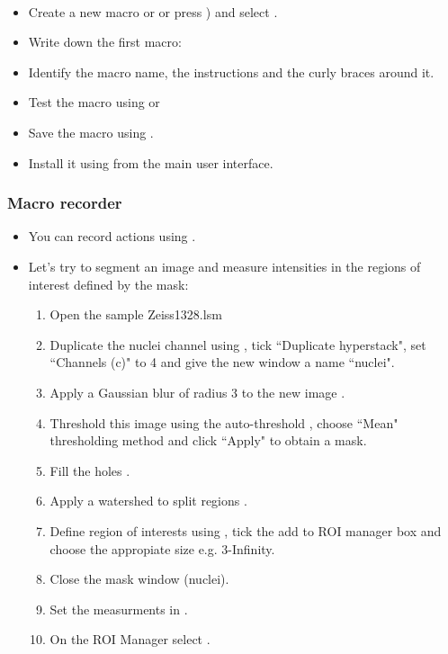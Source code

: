 \begin{frame}[fragile]
  \begin{example}~\par
  \begin{itemize}
   \item Create a new macro
   or  or press \keys{[}) and select .
  \item Write down the first macro:\par
    
  \item Identify the macro name, the instructions and the curly braces around it.
  \item Test the macro using  or 
  \item Save the macro using .
  \item Install it using  from the main user interface.
  \end{itemize}
\end{example}
\end{frame}

\begin{frame}
  \frametitle{Macro recorder}
  \begin{itemize}
  \item You can record actions using .
  \item Let's try to segment an image and measure intensities in the
    regions of interest defined by the mask:
    \begin{enumerate}
    \item Open the sample Zeiss1328.lsm 
    \item Duplicate the nuclei channel using  , tick ``Duplicate hyperstack", set ``Channels (c)" to 4 and give the new window a name ``nuclei".
    \item Apply a Gaussian blur of radius 3 to the new image .
    \item Threshold this image using the auto-threshold , choose ``Mean" thresholding method and click ``Apply" to obtain a mask.
    \item Fill the holes .
    \item Apply a watershed to split regions .
    \item Define region of interests using , tick the add to ROI manager box and choose the appropiate size e.g. 3-Infinity.
    \item Close the mask window (nuclei).
    \item Set the measurments in .
    \item On the ROI Manager select .
    \end{enumerate}
  \end{itemize}
\end{frame}

